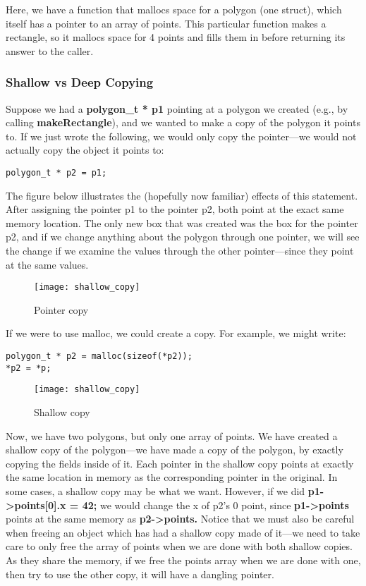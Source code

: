 \documentclass[11pt, a4paper]{article}
\begin{document}
Here, we have a function that mallocs space for a polygon (one struct), which itself has a pointer to an array of points. This particular function makes a rectangle, so it mallocs space for 4 points and fills them in before returning its answer to the caller.







\subsubsection{Shallow vs Deep Copying}%
\label{ssub:shallow_vs_deep_copying}


Suppose we had a \textbf{polygon\_t * p1} pointing at a polygon we created (e.g., by calling \textbf{makeRectangle}), and we wanted to make a copy of the polygon it points to. If we just wrote the following, we would only copy the pointer—we would not actually copy the object it points to:


\texttt{polygon\_t * p2 = p1;} 

The figure below illustrates the (hopefully now familiar) effects of this statement. After assigning the pointer p1 to the pointer p2, both point at the exact same memory location. The only new box that was created was the box for the pointer p2, and if we change anything about the polygon through one pointer, we will see the change if we examine the values through the other pointer—since they point at the same values.


\begin{figure}[htpb]
  \centering
  \texttt{[image: shallow\_copy]}
  \caption{Pointer copy}
  \label{fig:pointer_copy}
\end{figure}


If we were to use malloc, we could create a copy. For example, we might write:

\texttt{polygon\_t * p2 = malloc(sizeof(*p2));} \\
\texttt{*p2 = *p;} 

\begin{figure}[htpb]
  \centering
  \texttt{[image: shallow\_copy]}
  \caption{Shallow copy}
  \label{fig:shallow_copy}
\end{figure}



Now, we have two polygons, but only one array of points. We have created a shallow copy of the polygon—we have made a copy of the polygon, by exactly copying the fields inside of it. Each pointer in the shallow copy points at exactly the same location in memory as the corresponding pointer in the original. In some cases, a shallow copy may be what we want. However, if we did \textbf{p1->points[0].x = 42;} we would change the x of p2’s 0 point, since \textbf{p1->points} points at the same memory as \textbf{p2->points.} Notice that we must also be careful when freeing an object which has had a shallow copy made of it—we need to take care to only free the array of points when we are done with both shallow copies. As they share the memory, if we free the points array when we are done with one, then try to use the other copy, it will have a dangling pointer.
\end{document}
